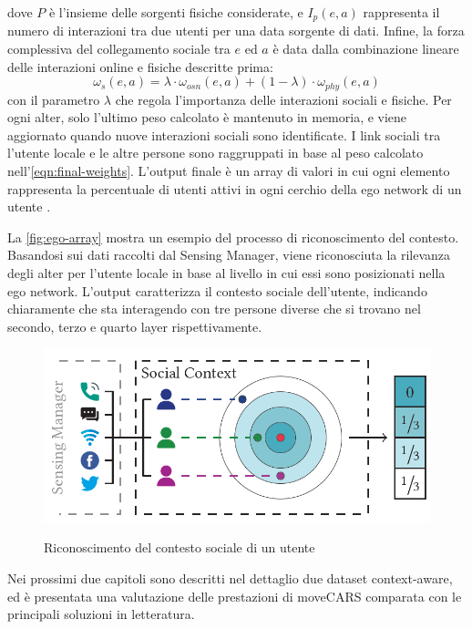 \documentclass[12pt,italian]{report}
\begin{document}
\noindent dove $P$ è l'insieme delle sorgenti fisiche considerate, e $I_p(e,a)$ rappresenta il numero di interazioni tra due utenti per una data sorgente di dati. Infine, la forza complessiva del collegamento sociale tra $e$ ed $a$ è data dalla combinazione lineare delle interazioni online e fisiche descritte prima:
\begin{equation}
\label{eqn:final-weights}
	\omega_s(e,a) = \lambda \cdot \omega_{osn}(e,a) + (1 - \lambda)
	\cdot \omega_{phy}(e,a)
\end{equation}
con il parametro $\lambda$ che regola l'importanza delle interazioni sociali e fisiche. Per ogni alter, solo l'ultimo peso calcolato è mantenuto in memoria, e viene aggiornato quando nuove interazioni sociali sono identificate. I link sociali tra l'utente locale e le altre persone sono raggruppati in base al peso calcolato nell'\autoref{eqn:final-weights}. L'output finale è un array di valori in cui ogni elemento rappresenta la percentuale di utenti attivi in ogni cerchio della ego network di un utente \cite{ego-net}. 

La \autoref{fig:ego-array} mostra un esempio del processo di riconoscimento del contesto. Basandosi sui dati raccolti dal Sensing Manager, viene riconosciuta la rilevanza degli alter per l'utente locale in base al livello in cui essi sono posizionati nella ego network. L'output caratterizza il contesto sociale dell'utente, indicando chiaramente che sta interagendo con tre persone diverse che si trovano nel secondo, terzo e quarto layer rispettivamente.

\begin{figure}
  \centering
  \includegraphics[scale=0.80]{immagini/ego-array.png}
  \caption{Riconoscimento del contesto sociale di un utente}
  \label{fig:ego-array}	
  \cite{ego-net}
\end{figure}

Nei prossimi due capitoli sono descritti nel dettaglio due dataset context-aware, ed è presentata una valutazione delle prestazioni di moveCARS comparata con le principali soluzioni in letteratura.
\end{document}
